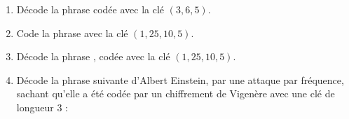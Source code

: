 \documentclass[class=report,crop=false, 12pt]{standalone}
\begin{document}
\begin{activite}
\begin{enumerate}
  \item Décode la phrase  codée avec la clé $(3,6,5)$.
  
  \item Code la phrase  avec la clé $(1,25,10,5)$.
  
  \item Décode la phrase , codée avec la clé $(1,25,10,5)$.  
  
  \item Décode la phrase suivante d'Albert Einstein, par une attaque par fréquence, sachant qu'elle a été codée par un chiffrement de Vigenère avec une clé de longueur $3$ :
  
  \centerline{}
   \centerline{}
  
\end{enumerate}

\end{activite}
\end{document}
